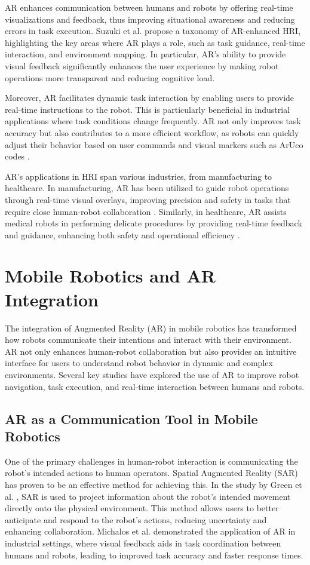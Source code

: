 AR enhances communication between humans and robots by offering real-time visualizations and feedback, thus improving situational awareness and reducing errors in task execution. Suzuki et al. \cite{Suzuki2022} propose a taxonomy of AR-enhanced HRI, highlighting the key areas where AR plays a role, such as task guidance, real-time interaction, and environment mapping. In particular, AR’s ability to provide visual feedback significantly enhances the user experience by making robot operations more transparent and reducing cognitive load.

Moreover, AR facilitates dynamic task interaction by enabling users to provide real-time instructions to the robot. This is particularly beneficial in industrial applications where task conditions change frequently. AR not only improves task accuracy but also contributes to a more efficient workflow, as robots can quickly adjust their behavior based on user commands and visual markers such as ArUco codes \cite{Suzuki2022}.

AR's applications in HRI span various industries, from manufacturing to healthcare. In manufacturing, AR has been utilized to guide robot operations through real-time visual overlays, improving precision and safety in tasks that require close human-robot collaboration \cite{Hentout2019}. Similarly, in healthcare, AR assists medical robots in performing delicate procedures by providing real-time feedback and guidance, enhancing both safety and operational efficiency \cite{Suzuki2022}. 

\section{Mobile Robotics and AR Integration}

The integration of Augmented Reality (AR) in mobile robotics has transformed how robots communicate their intentions and interact with their environment. AR not only enhances human-robot collaboration but also provides an intuitive interface for users to understand robot behavior in dynamic and complex environments. Several key studies have explored the use of AR to improve robot navigation, task execution, and real-time interaction between humans and robots.

\subsection{AR as a Communication Tool in Mobile Robotics}

One of the primary challenges in human-robot interaction is communicating the robot’s intended actions to human operators. Spatial Augmented Reality (SAR) has proven to be an effective method for achieving this. In the study by Green et al. \cite{Green2019}, SAR is used to project information about the robot’s intended movement directly onto the physical environment. This method allows users to better anticipate and respond to the robot’s actions, reducing uncertainty and enhancing collaboration. Michalos et al. \cite{Michalos2022} demonstrated the application of AR in industrial settings, where visual feedback aids in task coordination between humans and robots, leading to improved task accuracy and faster response times.

